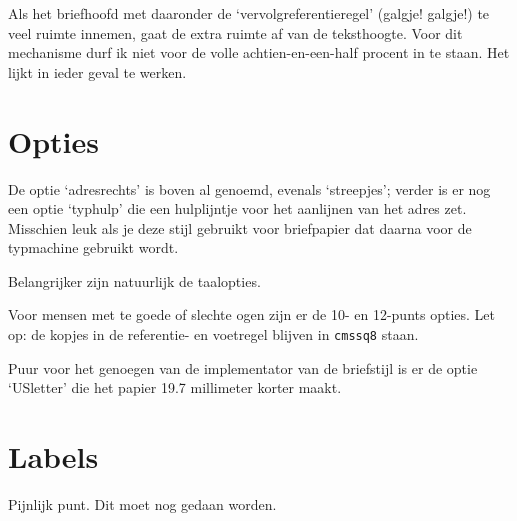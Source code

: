 Als het briefhoofd met daaronder de `vervolgreferentieregel'                    
(galgje! galgje!) te veel ruimte innemen, gaat de extra ruimte                  
af van de teksthoogte. Voor dit mechanisme durf ik niet                         
voor de volle achtien-en-een-half procent in te staan.                          
Het lijkt in ieder geval te werken.                                             
                                                                                
                                                                                
\section{Opties}                                                                
                                                                                
De optie `adresrechts' is  boven al genoemd, evenals `streepjes';               
verder is er nog een optie `typhulp' die een                                    
hulplijntje voor het aanlijnen van het adres zet. Misschien leuk                
als je deze stijl gebruikt voor briefpapier dat daarna voor de                  
typmachine gebruikt wordt.                                                      
                                                                                
Belangrijker zijn natuurlijk de taalopties.                                     
                                                                                
Voor mensen met te goede of slechte ogen zijn er de 10- en                      
12-punts opties. Let op: de kopjes in de referentie- en                         
voetregel blijven in {\tt cmssq8} staan.                                        
                                                                                
Puur voor het genoegen van de implementator van de briefstijl                   
is er de optie `USletter' die het papier 19.7 millimeter                        
korter maakt.                                                                   
                                                                                
\section{Labels}                                                                
                                                                                
Pijnlijk punt. Dit moet nog gedaan worden.                                      
                                                                  
                                                                                

